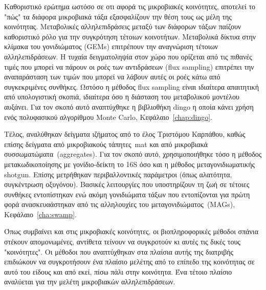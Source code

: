 \documentclass[master=elt, cleveref, autoref, masteroption=eg]{kulemt}
\begin{document}
\begin{abstract*}
   Καθοριστικό ερώτημα ωστόσο σε οτι αφορά τις μικροβιακές κοινότητες, αποτελεί το "πώς" τα διάφορα μικροβιακά τάξα 
   εξασφαλίζουν την θέση τους ως μέλη της κοινότητας. 
   Μεταβολικές αλληλεπιδράσεις μεταξύ των διάφορων τάξων παίζουν καθοριστικό ρόλο για την συγκρότηση 
   τέτοιων κοινοτήτων. 
   Μεταβολικά δίκτυα στην κλίμακα του γονιδιώματος (\foreignlanguage{english}{GEMs}) επιτρέπουν την 
   αναγνώριση τέτοιων αλληλεπιδράσεων. 
   Η τυχαία δειγματοληψία στον χώρο που ορίζεται από τις πιθανές τιμές που μπορεί να πάρουν οι ροές των αντιδράσεων (\foreignlanguage{english}{flux sampling})
   επιτρέπει την αναπαράσταση των τιμών που μπορεί να λάβουν αυτές οι ροές κάτω από συγκεκριμένες συνθήκες. 
   Ωστόσο η μέθοδος \foreignlanguage{english}{flux sampling} είναι ιδιαίτερα απαιτητική από υπολογιστική σκοπιά,
   ιδιαίτερα όσο η διάσταση του μεταβολικού μοντέλου αυξάνει.
   Για τον σκοπό αυτό αναπτύχθηκε η βιβλιοθήκη \foreignlanguage{english}{dingo} η οποία κάνει χρήση ενός 
   πολυφασικού αλγορίθμου \foreignlanguage{english}{Monte Carlo}, Κεφάλαιο~\foreignlanguage{english}{\ref{chap:dingo}}. 

   Τέλος, αναλύθηκαν δείγματα ιζήματος από το έλος Τριστόμου Καρπάθου, καθώς επίσης
   δείγματα από μικροβιακούς τάπητες~\foreignlanguage{english}{mat} και από μικροβιακά συσσωματώματα~(\foreignlanguage{english}{aggregates}).
   Για τον σκοπό αυτό, χρησιμοποιήθηκε τόσο η μέθοδος μετακωδικοποίησης με γονίδιο-δείκτη το 16\foreignlanguage{english}{S}
   όσο και η μέθοδος μεταγονιδιωματικής \foreignlanguage{english}{shotgun}.
   Επίσης μετρήθηκαν περιβαλλοντικές παράμετροι (όπως αλατότητα, συγκέντρωση οξυγόνου). 
   Βασικές λειτουργίες που υποστηρίζουν τη ζωή σε τέτοιες συνθήκες εντοπίστηκαν 
   ενώ ακόμη γονιδιώματα τάξων που εντοπίζονται για πρώτη φορά ανασκευαάστηκαν από τις αλληλουχίες του μεταγονιδιώματος~(\foreignlanguage{english}{MAGs}), Κεφάλαιο~\foreignlanguage{english}{\ref{cha:swamp}}.

   Όπως συμβαίνει και στις μικροβιακές κοινότητες, οι βιοπληροφορικές μέθοδοι σπάνια στέκουν 
   απομονωμένες, αντίθετα τείνουν να συγκροτούν κι αυτές τις δικές τους "κοινότητες". 
   Οι μέθοδοι που αναπτύχθηκαν στα πλαίσια αυτής της διατριβής επιδιώκουν να συγκροτήσουν ένα πλαίσιο μελέτης
   από το επίπεδο της κοινότητας σε αυτό του είδους και από εκεί, πίσω πάλι στην κοινότητα. 
   Ένα τέτοιο πλαίσιο αναλύεται για την μελέτη μικροβιακών αλληλεπιδράσεων. 



\end{abstract*}
\end{document}
